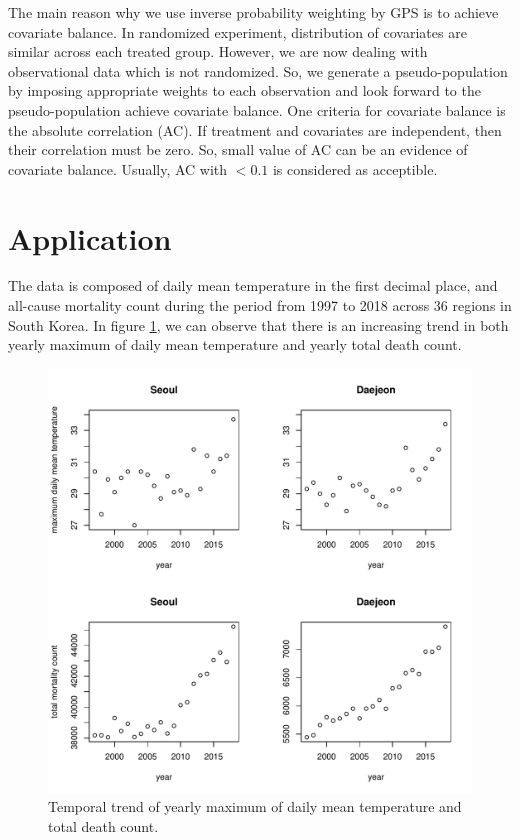 \documentclass[12pt]{article}
\begin{document}
The main reason why we use inverse probability weighting by GPS is to achieve covariate balance.
In randomized experiment, distribution of covariates are similar across each treated group.
However, we are now dealing with observational data which is not randomized.
So, we generate a pseudo-population by imposing appropriate weights to each observation
and look forward to the pseudo-population achieve covariate balance.
One criteria for covariate balance is the absolute correlation (AC)\cite{gpsboosting2015}.
If treatment and covariates are independent, then their correlation must be zero.
So, small value of AC can be an evidence of covariate balance.
Usually, AC with $ <0.1 $ is considered as acceptible.

\section{Application}

The data is composed of daily mean temperature in the first decimal place, and
all-cause mortality count during the period from 1997 to 2018 across 36 regions in South Korea.
In figure \ref{figure:temporal-trend},
we can observe that there is an increasing trend in 
both yearly maximum of daily mean temperature and yearly total death count.
\begin{figure}
	\includegraphics[width = \textwidth]{figures/temporal-trend.pdf}
	\caption{Temporal trend of yearly maximum of daily mean temperature and total death count.}
	\label{figure:temporal-trend}
\end{figure}
\end{document}
